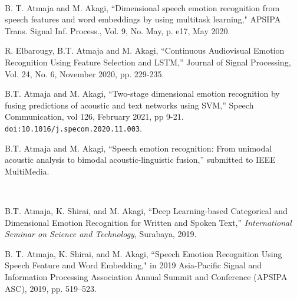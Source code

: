 

\renewcommand{\nomname}{PUBLICATIONS}
\markboth{\nomname}{\nomname}



\begin{publication}
\item[] \hspace{-1cm}{\LARGE\bf Journals} \\ 

\item 
B. T. Atmaja and M. Akagi, ``Dimensional speech emotion recognition from speech
features and word embeddings by using multitask learning," APSIPA Trans. Signal
Inf. Process., Vol. 9, No. May, p. e17, May 2020.

\item
R. Elbarougy, B.T. Atmaja and M. Akagi, ``Continuous Audiovisual Emotion
Recognition Using Feature Selection and LSTM,'' Journal of Signal Processing,
Vol. 24, No. 6, November 2020, pp. 229-235. 

\item
B.T. Atmaja and M. Akagi, ``Two-stage dimensional emotion recognition by fusing
predictions of acoustic and text networks using SVM,'' Speech Communication,
vol 126, February 2021, pp 9-21.
\verb|doi:10.1016/j.specom.2020.11.003|. 

\item 
B.T. Atmaja and M. Akagi, ``Speech emotion recognition: From unimodal acoustic
analysis to bimodal acoustic-linguistic fusion,'' submitted to IEEE MultiMedia.
\\

\item[] \hspace{-1cm}{\LARGE\bf International Conferences} \\ 

\item 
B.T. Atmaja, K. Shirai, and M. Akagi, ``Deep Learning-based Categorical and
Dimensional Emotion Recognition for Written and Spoken Text,''
\textit{International Seminar on Science and Technology}, Surabaya, 2019.

\item 
B. T. Atmaja, K. Shirai, and M. Akagi, ``Speech Emotion Recognition Using
Speech Feature and Word Embedding," in 2019 Asia-Pacific Signal and Information
Processing Association Annual Summit and Conference (APSIPA ASC), 2019, pp.
519--523.


\end{publication}
